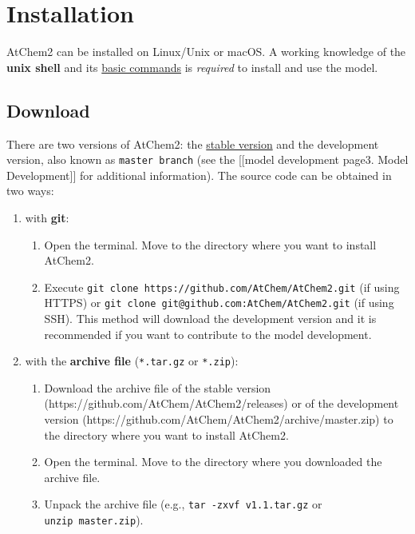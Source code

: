 \section{Installation} \label{sec:install}

AtChem2 can be installed on Linux/Unix or macOS. A working knowledge of
the \textbf{unix shell} and its
\href{https://swcarpentry.github.io/shell-novice/reference/}{basic
commands} is \emph{required} to install and use the model.

\hypertarget{download}{%
\subsection{Download}\label{download}}

There are two versions of AtChem2: the
\href{https://github.com/AtChem/AtChem2/releases}{stable version} and
the development version, also known as \texttt{master\ branch} (see the
{[}{[}model development page\textbar{}3. Model Development{]}{]} for
additional information). The source code can be obtained in two ways:

\begin{enumerate}
\def\labelenumi{\arabic{enumi}.}
\item
  with \textbf{git}:

  \begin{enumerate}
  \def\labelenumii{\arabic{enumii}.}
    \item
    Open the terminal. Move to the directory where you want to install
    AtChem2.
  \item
    Execute \texttt{git\ clone\ https://github.com/AtChem/AtChem2.git}
    (if using HTTPS) or
    \texttt{git\ clone\ git@github.com:AtChem/AtChem2.git} (if using
    SSH). This method will download the development version and it is
    recommended if you want to contribute to the model development.
  \end{enumerate}
\item
  with the \textbf{archive file} (\texttt{*.tar.gz} or \texttt{*.zip}):

  \begin{enumerate}
  \def\labelenumii{\arabic{enumii}.}
    \item
    Download the archive file of the stable version
    (https://github.com/AtChem/AtChem2/releases) or of the development
    version (https://github.com/AtChem/AtChem2/archive/master.zip) to
    the directory where you want to install AtChem2.
  \item
    Open the terminal. Move to the directory where you downloaded the
    archive file.
  \item
    Unpack the archive file (e.g., \texttt{tar\ -zxvf\ v1.1.tar.gz} or
    \texttt{unzip\ master.zip}).
  \end{enumerate}
\end{enumerate}

